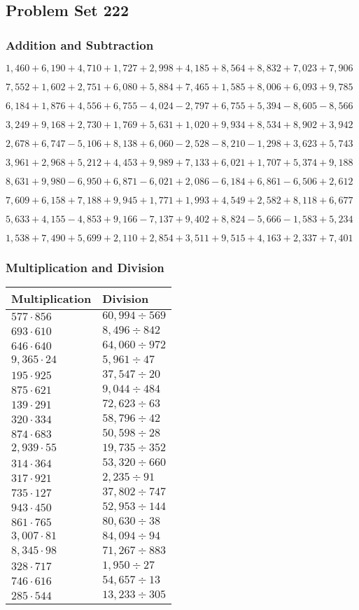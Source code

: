 \hypertarget{problem-set-222}{%
\subsection{Problem Set 222}\label{problem-set-222}}

\hypertarget{addition-and-subtraction}{%
\subsubsection{Addition and
Subtraction}\label{addition-and-subtraction}}

\(1,460+6,190+4,710+1,727+2,998+4,185+8,564+8,832+7,023+7,906\)

\(7,552+1,602+2,751+6,080+5,884+7,465+1,585+8,006+6,093+9,785\)

\(6,184+1,876+4,556+6,755-4,024-2,797+6,755+5,394-8,605-8,566\)

\(3,249+9,168+2,730+1,769+5,631+1,020+9,934+8,534+8,902+3,942\)

\(2,678+6,747-5,106+8,138+6,060-2,528-8,210-1,298+3,623+5,743\)

\(3,961+2,968+5,212+4,453+9,989+7,133+6,021+1,707+5,374+9,188\)

\(8,631+9,980-6,950+6,871-6,021+2,086-6,184+6,861-6,506+2,612\)

\(7,609+6,158+7,188+9,945+1,771+1,993+4,549+2,582+8,118+6,677\)

\(5,633+4,155-4,853+9,166-7,137+9,402+8,824-5,666-1,583+5,234\)

\(1,538+7,490+5,699+2,110+2,854+3,511+9,515+4,163+2,337+7,401\)

\hypertarget{multiplication-and-division}{%
\subsubsection{Multiplication and
Division}\label{multiplication-and-division}}

\begin{longtable}[]{@{}ll@{}}
\toprule
Multiplication & Division\tabularnewline
\midrule
\endhead
\(577\cdot856\) & \(60,994÷569\)\tabularnewline
\(693\cdot610\) & \(8,496÷842\)\tabularnewline
\(646\cdot640\) & \(64,060÷972\)\tabularnewline
\(9,365\cdot24\) & \(5,961÷47\)\tabularnewline
\(195\cdot925\) & \(37,547÷20\)\tabularnewline
\(875\cdot621\) & \(9,044÷484\)\tabularnewline
\(139\cdot291\) & \(72,623÷63\)\tabularnewline
\(320\cdot334\) & \(58,796÷42\)\tabularnewline
\(874\cdot683\) & \(50,598÷28\)\tabularnewline
\(2,939\cdot55\) & \(19,735÷352\)\tabularnewline
\(314\cdot364\) & \(53,320÷660\)\tabularnewline
\(317\cdot921\) & \(2,235÷91\)\tabularnewline
\(735\cdot127\) & \(37,802÷747\)\tabularnewline
\(943\cdot450\) & \(52,953÷144\)\tabularnewline
\(861\cdot765\) & \(80,630÷38\)\tabularnewline
\(3,007\cdot81\) & \(84,094÷94\)\tabularnewline
\(8,345\cdot98\) & \(71,267÷883\)\tabularnewline
\(328\cdot717\) & \(1,950÷27\)\tabularnewline
\(746\cdot616\) & \(54,657÷13\)\tabularnewline
\(285\cdot544\) & \(13,233÷305\)\tabularnewline
\bottomrule
\end{longtable}
